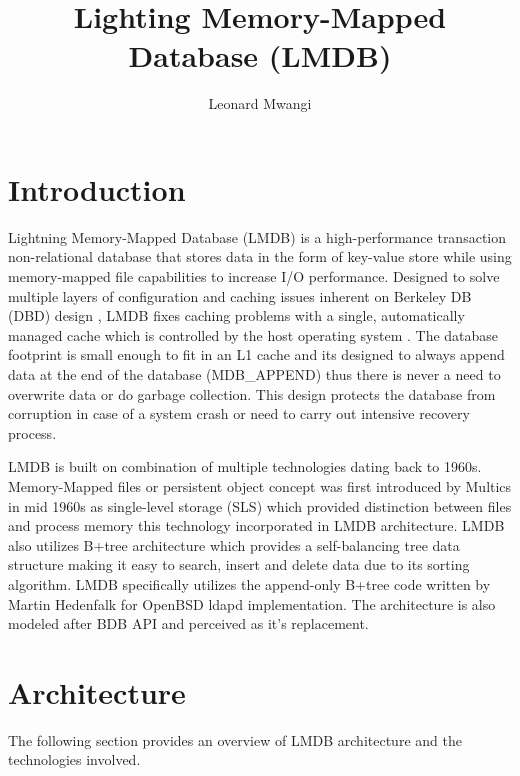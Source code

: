 \documentclass[9pt,twocolumn,twoside]{../../styles/osajnl}
\title{Lighting Memory-Mapped Database (LMDB)}
\author[1]{Leonard Mwangi}
\affil[1]{School of Informatics and Computing, Bloomington, IN 47408, U.S.A.}
\affil[*]{Corresponding authors: lmwangi@iu.edu}
\begin{document}
\maketitle


\section{Introduction}

Lightning Memory-Mapped Database (LMDB) is a high-performance
transaction non-relational database that stores data in the form of
key-value store \cite{www-keyvalue} while using memory-mapped file
capabilities to increase I/O performance. Designed to solve multiple
layers of configuration and caching issues inherent on Berkeley DB
(DBD) design \cite{www-bdb}, LMDB fixes caching problems with a
single, automatically managed cache which is controlled by the host
operating system \cite{www-lmdb}. The database footprint is small
enough to fit in an L1 cache \cite{www-l-cache} and its designed to
always append data at the end of the database (MDB\_APPEND) thus there
is never a need to overwrite data or do garbage collection. This
design protects the database from corruption in case of a system crash
or need to carry out intensive recovery process.

LMDB is built on combination of multiple technologies dating back to
1960s. Memory-Mapped files or persistent object concept was first
introduced by Multics in mid 1960s as single-level storage (SLS)
\cite{www-multics} which provided distinction between files and
process memory this technology incorporated in LMDB architecture. LMDB
also utilizes B+tree architecture which provides a self-balancing tree
data structure making it easy to search, insert and delete data due to
its sorting algorithm. LMDB specifically utilizes the append-only
B+tree code written by Martin Hedenfalk \cite{www-btreecode} for
OpenBSD ldapd implementation. The architecture is also modeled after
BDB API and perceived as it’s replacement.

\section{Architecture}
The following section provides an overview of LMDB architecture and
the technologies involved.
\end{document}
